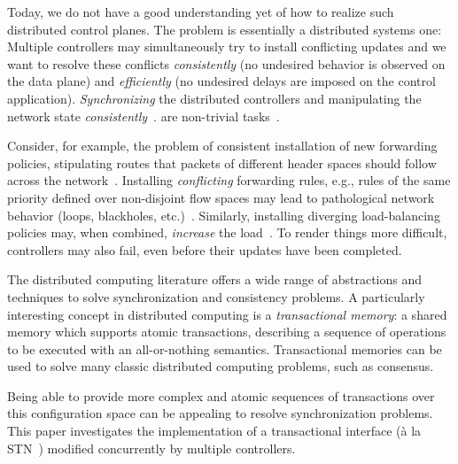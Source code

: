 \documentclass[conference]{sigcomm-alternate}
\begin{document}

Today, we do not have a good understanding yet of how to realize
such distributed control planes. The problem is essentially a
distributed systems
one: Multiple controllers may simultaneously try to
install conflicting updates and we want to resolve these conflicts
\emph{consistently} (no undesired behavior is observed on the data
plane) and \emph{efficiently} (no undesired delays are imposed on the
control application).
\emph{Synchronizing}
the distributed controllers and manipulating the network state \emph{consistently}~\cite{cpc}.
are non-trivial tasks~\cite{cap-theorem}.

Consider, for example, the problem of
consistent installation of new forwarding policies, stipulating routes
that packets of different header spaces should follow across the
network~\cite{network-update,roger-hotnets,correct,stn}.
Installing \emph{conflicting} forwarding rules, e.g., rules of the same priority defined over non-disjoint
flow spaces may lead to pathological network behavior (loops,
blackholes, etc.)~\cite{cpc}.
Similarly, installing diverging load-balancing policies may,
when combined, \emph{increase} the load~\cite{log-cent}.
To render things more difficult, controllers may also fail,
even before their updates have been completed.

The distributed computing literature offers
a wide range of abstractions
and techniques to solve synchronization and consistency problems.
A particularly interesting concept in distributed computing is a \emph{transactional memory}:
a shared memory which supports atomic transactions, describing a sequence of operations
to be executed with an all-or-nothing semantics. Transactional memories can be used to
 solve many
classic distributed computing problems, such as consensus.

Being able to provide more complex and atomic sequences of transactions over this configuration
space can be appealing to resolve synchronization problems.
This paper investigates the implementation of a transactional interface 
(\`{a} la STN~\cite{stn}) modified concurrently by multiple controllers. 
\end{document}
